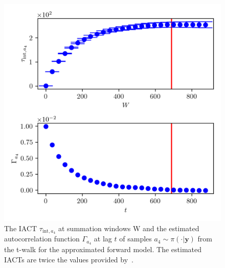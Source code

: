 \begin{figure}[ht!]
	\centering
	\includegraphics{UwerrTauIntTWalk13.png}
	\caption[IACT and autocorrelation function of samples $a_4 \sim \pi(\cdot|\bm{y})$, for approximated model.]{The IACT $\tau_{\text{int},a_4}$ at summation windows W and the estimated autocorrelation function $\Gamma_{a_4}$ at lag $t$ of samples $a_4 \sim \pi( \cdot| \bm{y})$ from the t-walk for the approximated forward model.
	The estimated IACTs are twice the values provided by~\cite{drikHesse, UwerrM}.}
	\label{fig:TWalkIATC14}
\end{figure}
